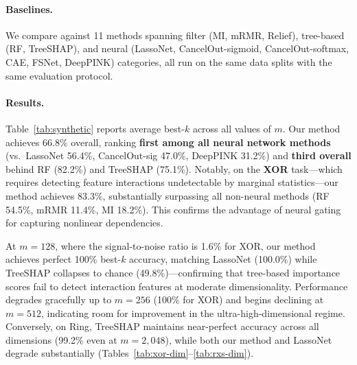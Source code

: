 \documentclass{uai2026} %
\theoremstyle{definition}
\theoremstyle{remark}
\begin{document}
\paragraph{Baselines.}
We compare against 11 methods spanning filter (MI, mRMR, Relief), tree-based (RF, TreeSHAP), and neural (LassoNet, CancelOut-sigmoid, CancelOut-softmax, CAE, FSNet, DeepPINK) categories, all run on the same data splits with the same evaluation protocol.

\paragraph{Results.}
Table~\ref{tab:synthetic} reports average best-$k$ across all values of $m$.
Our method achieves 66.8\% overall, ranking \textbf{first among all neural network methods} (vs.\ LassoNet 56.4\%, CancelOut-sig 47.0\%, DeepPINK 31.2\%) and \textbf{third overall} behind RF (82.2\%) and TreeSHAP (75.1\%).
Notably, on the \textbf{XOR} task---which requires detecting feature interactions undetectable by marginal statistics---our method achieves 83.3\%, substantially surpassing all non-neural methods (RF 54.5\%, mRMR 11.4\%, MI 18.2\%).
This confirms the advantage of neural gating for capturing nonlinear dependencies.

At $m{=}128$, where the signal-to-noise ratio is 1.6\% for XOR, our method achieves perfect 100\% best-$k$ accuracy, matching LassoNet (100.0\%) while TreeSHAP collapses to chance (49.8\%)---confirming that tree-based importance scores fail to detect interaction features at moderate dimensionality.
Performance degrades gracefully up to $m{=}256$ (100\% for XOR) and begins declining at $m{=}512$, indicating room for improvement in the ultra-high-dimensional regime.
Conversely, on Ring, TreeSHAP maintains near-perfect accuracy across all dimensions (99.2\% even at $m{=}2{,}048$), while both our method and LassoNet degrade substantially (Tables~\ref{tab:xor-dim}--\ref{tab:rxs-dim}).
\end{document}
